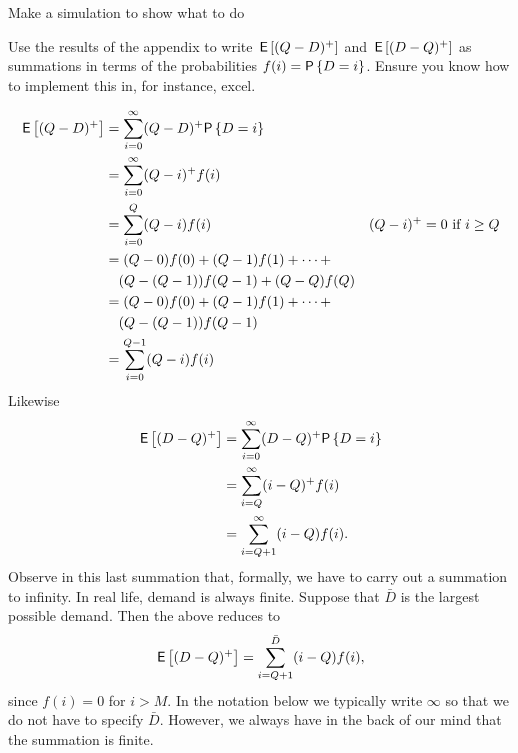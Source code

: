 
\begin{exercise}
  Make a simulation to show what to do
\end{exercise}


\begin{exercise}
  Use the results of the appendix to write $\,\mathsf{E}\left[(Q-D)^+\right]$ and $\,\mathsf{E}\left[(D-Q)^+\right]$ as summations in terms of the probabilities $f(i) = \P{D=i}$. Ensure you know how to implement this in, for instance, excel.
  \begin{solution}
\begin{align*}
  \E{ (Q-D)^+}
  &= \sum_{i=0}^\infty (Q-D)^+\P{D=i}\\
  &= \sum_{i=0}^\infty (Q-i)^+ f(i)\\
  &= \sum_{i=0}^Q (Q-i) f(i) & (Q-i)^+=0\text{ if } i \geq Q\\
  &= (Q-0) f(0) + (Q-1)f(1)+ \cdots + \\
&\quad (Q-(Q-1))f(Q-1) + (Q-Q)f(Q) \\
  &= (Q-0) f(0)+ (Q-1)f(1)+ \cdots + \\
&\quad(Q-(Q-1))f(Q-1)\\
  &= \sum_{i=0}^{Q-1} (Q-i) f(i) \\
\end{align*}
Likewise
\begin{align*}
  \E{ (D-Q)^+}
  &= \sum_{i=0}^\infty (D-Q)^+\P{D=i}\\
  &= \sum_{i=Q}^\infty (i-Q)^+ f(i)\\
  &= \sum_{i=Q+1}^{\infty} (i-Q) f(i).
\end{align*}
Observe in this last summation that, formally, we have to carry out a summation to infinity. In real life, demand is always finite. Suppose that $\bar D$ is the largest possible demand. Then the above reduces to
\begin{align*}
  \,\mathsf{E}\left[ (D-Q)^+\right]= \sum_{i=Q+1}^{\bar D} (i-Q) f(i),
\end{align*}
since $f(i)=0$ for $i>M$.   In the notation below we typically write $\infty$ so that we do not have to specify $\bar D$. However, we always have in the back of our mind that the summation is finite.
  \end{solution}
\end{exercise}


